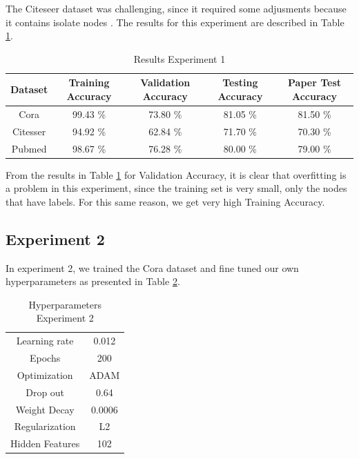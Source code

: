 The Citeseer dataset was challenging, since it required some adjusments because it contains isolate nodes . The results for this experiment are described in Table \ref{tab:results1}.

\begin {table}[ht]
\caption {Results Experiment 1} \label{tab:results1} 
  \begin{center}
    \begin{tabular}{|c|c|c|c|c|}
    \hline
    Dataset    &  Training Accuracy & Validation Accuracy & Testing Accuracy & Paper Test Accuracy \\ \hline
    Cora          & 99.43 \% & 73.80 \%  & 81.05 \% & 81.50 \% \\ 
    Citesser      & 94.92 \% & 62.84 \%  & 71.70 \% & 70.30 \% \\
    Pubmed        & 98.67 \% & 76.28 \%  & 80.00 \% & 79.00 \% \\
    \hline
    \end{tabular}
  \end{center}
\end{table}

From the results in Table \ref{tab:results1} for Validation Accuracy, it is clear that overfitting is a problem in this experiment, since the training set is very small, only the nodes that have labels. For this same reason, we get very high Training Accuracy. 

\subsection{Experiment 2}
In experiment 2, we trained the Cora dataset and fine tuned our own hyperparameters as presented in Table \ref{tab:hyperparameters2}.

\begin {table}[ht]
\caption {Hyperparameters Experiment 2} \label{tab:hyperparameters2} 
  \begin{center}
    \begin{tabular}{|c|c|}
    \hline
    Learning rate     & 0.012 \\ 
    Epochs            & 200  \\ 
    Optimization      & ADAM \\
    Drop out          & 0.64   \\
    Weight Decay      & 0.0006 \\
    Regularization    & L2    \\
    Hidden Features   & 102   \\
    \hline
    \end{tabular}
  \end{center}
\end{table}

